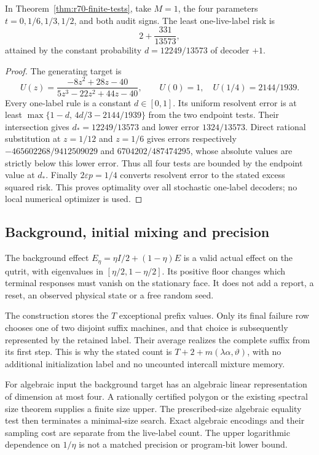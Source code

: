 \begin{proposition}\label{prop:r70-one-label}
In Theorem~\ref{thm:r70-finite-tests}, take $M=1$, the four parameters $t=0,1/6,1/3,1/2$, and both audit signs. The least one-live-label risk is
\[
 2+\frac{331}{13573},
\]
attained by the constant probability $d=12249/13573$ of decoder $+1$.
\end{proposition}
\begin{proof}
The generating target is
\[
 U(z)=\frac{-8z^2+28z-40}{5z^3-22z^2+44z-40},
 \qquad U(0)=1,\quad U(1/4)=2144/1939.
\]
Every one-label rule is a constant $d\in[0,1]$. Its uniform resolvent error is at least
$\max\{1-d,\,4d/3-2144/1939\}$ from the two endpoint tests. Their intersection gives $d_*=12249/13573$ and lower error $1324/13573$. Direct rational substitution at $z=1/12$ and $z=1/6$ gives errors respectively
$-465602268/9412509029$ and $6704202/487474295$, whose absolute values are strictly below this lower error. Thus all four tests are bounded by the endpoint value at $d_*$. Finally $2\varepsilon p=1/4$ converts resolvent error to the stated excess squared risk. This proves optimality over all stochastic one-label decoders; no local numerical optimizer is used.
\end{proof}

\subsection{Background, initial mixing and precision}
The background effect $E_\eta=\eta I/2+(1-\eta)E$ is a valid actual effect on the qutrit, with eigenvalues in $[\eta/2,1-\eta/2]$. Its positive floor changes which terminal responses must vanish on the stationary face. It does not add a report, a reset, an observed physical state or a free random seed.

The construction stores the $T$ exceptional prefix values. Only its final failure row chooses one of two disjoint suffix machines, and that choice is subsequently represented by the retained label. Their average realizes the complete suffix from its first step. This is why the stated count is $T+2+m(\lambda\alpha,\vartheta)$, with no additional initialization label and no uncounted intercall mixture memory.

For algebraic input the background target has an algebraic linear representation of dimension at most four. A rationally certified polygon or the existing spectral size theorem supplies a finite size upper. The prescribed-size algebraic equality test then terminates a minimal-size search. Exact algebraic encodings and their sampling cost are separate from the live-label count. The upper logarithmic dependence on $1/\eta$ is not a matched precision or program-bit lower bound.
